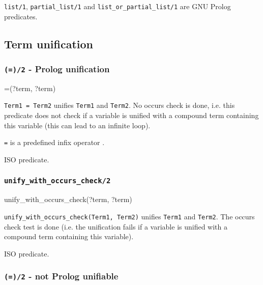 \texttt{list/1}, \texttt{partial\_list/1} and
\texttt{list\_or\_partial\_list/1} are GNU Prolog predicates.

\subsection{Term unification}

\subsubsection{\texttt{(=)/2} - Prolog unification}

\begin{TemplatesOneCol}
=(?term, ?term)

\end{TemplatesOneCol}

\Description

\texttt{Term1 = Term2} unifies \texttt{Term1} and \texttt{Term2}. No occurs
check is done, i.e. this predicate does not check if a variable is unified
with a compound term containing this variable (this can lead to an infinite
loop).

\texttt{=} is a predefined infix operator .

\PlErrorsNone

\Portability

ISO predicate.

\subsubsection{\texttt{unify\_with\_occurs\_check/2}}

\begin{TemplatesOneCol}
unify\_with\_occurs\_check(?term, ?term)
\end{TemplatesOneCol}

\Description

\texttt{unify\_with\_occurs\_check(Term1, Term2)} unifies \texttt{Term1} and
\texttt{Term2}. The occurs check test is done (i.e. the unification fails if
a variable is unified with a compound term containing this variable).

\PlErrorsNone

\Portability

ISO predicate.

\subsubsection{\texttt{({\bs}=)/2} - not Prolog unifiable}

